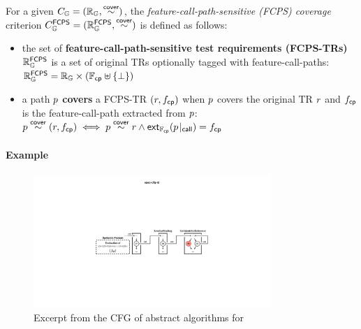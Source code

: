 \begin{definition}\label{def:fcps-cov}
  For a given $C_{\mathbb{G}} = (\mathbb{R}_{\mathbb{G}}, \overset{\textsf{cover}}{\sim})$, the
  \textit{feature-call-path-sensitive (FCPS) coverage} criterion $C_{\mathbb{G}}^{\textsf{FCPS}}
  = (\mathbb{R}_{\mathbb{G}}^{\textsf{FCPS}}, \overset{\textsf{cover}}{\sim})$ is defined as follows:
  \begin{itemize}
    \item the set of \textbf{feature-call-path-sensitive test requirements
      (FCPS-TRs)} $\mathbb{R}_{\mathbb{G}}^{\textsf{FCPS}}$ is a set of original TRs optionally tagged
      with feature-call-paths:
$
        \mathbb{R}_{\mathbb{G}}^{\textsf{FCPS}} = \mathbb{R}_{\mathbb{G}} \times (\mathbb{F}_{\textsf{cp}} \uplus \{ \bot \})
$
    \item a path $p$ \textbf{covers} a FCPS-TR $(r, f_{\textsf{cp}})$ when $p$
      covers the original TR $r$ and $f_{\textsf{cp}}$ is the feature-call-path extracted
      from $p$:
$
        p \overset{\textsf{cover}}{\sim} (r, f_{\textsf{cp}}) \iff p \overset{\textsf{cover}}{\sim} r \wedge
        \textsf{ext}_{\mathbb{F}_{\textsf{cp}}}({p}\!\mid_{\textsf{call}}) = f_{\textsf{cp}}
$
  \end{itemize}
\end{definition}


\paragraph{\textbf{Example}}

\begin{figure}
  \includegraphics[width=0.8\textwidth]{img/spec-cfg-id}
\vspace*{-.5em}
  \caption{
Excerpt from the CFG of abstract algorithms for 
  }
  \label{fig:spec-cfg-id}
\vspace*{-1em}
\end{figure}

